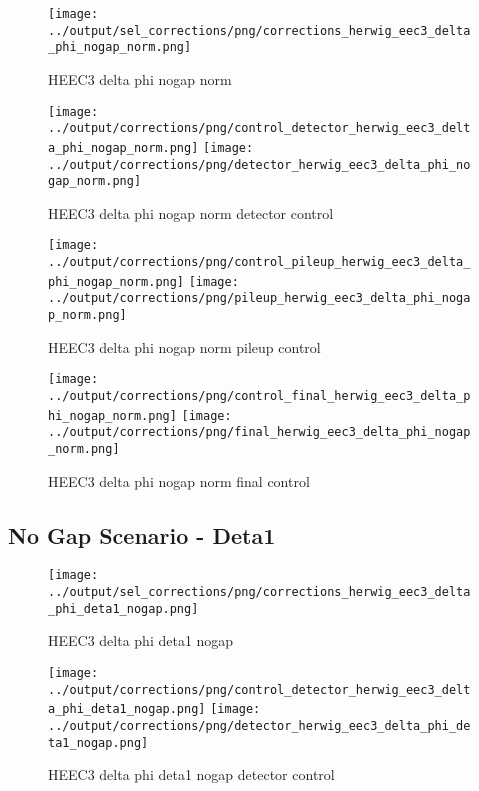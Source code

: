 \documentclass[11pt]{book}
\begin{document}
\begin{figure}[ht]
\centering
\texttt{[image: ../output/sel\_corrections/png/corrections\_herwig\_eec3\_delta\_phi\_nogap\_norm.png]}
\caption{HEEC3 delta phi nogap norm}
\label{fig:HEEC3_delta_phi_nogap_norm}
\end{figure}

\begin{figure}[ht]
\centering
\texttt{[image: ../output/corrections/png/control\_detector\_herwig\_eec3\_delta\_phi\_nogap\_norm.png]}
\texttt{[image: ../output/corrections/png/detector\_herwig\_eec3\_delta\_phi\_nogap\_norm.png]}
\caption{HEEC3 delta phi nogap norm detector control}
\label{fig:HEEC3_delta_phi_nogap_norm_detector_control}
\end{figure}

\begin{figure}[ht]
\centering
\texttt{[image: ../output/corrections/png/control\_pileup\_herwig\_eec3\_delta\_phi\_nogap\_norm.png]}
\texttt{[image: ../output/corrections/png/pileup\_herwig\_eec3\_delta\_phi\_nogap\_norm.png]}
\caption{HEEC3 delta phi nogap norm pileup control}
\label{fig:HEEC3_delta_phi_nogap_norm_pileup_control}
\end{figure}


\begin{figure}[ht]
\centering
\texttt{[image: ../output/corrections/png/control\_final\_herwig\_eec3\_delta\_phi\_nogap\_norm.png]}
\texttt{[image: ../output/corrections/png/final\_herwig\_eec3\_delta\_phi\_nogap\_norm.png]}
\caption{HEEC3 delta phi nogap norm final control}
\label{fig:HEEC3_delta_phi_nogap_norm_final_control}
\end{figure}


\clearpage
\subsection{No Gap Scenario - Deta1}
\begin{figure}[ht]
\centering
\texttt{[image: ../output/sel\_corrections/png/corrections\_herwig\_eec3\_delta\_phi\_deta1\_nogap.png]}
\caption{HEEC3 delta phi deta1 nogap}
\label{fig:HEEC3_delta_phi_deta1_nogap}
\end{figure}


\begin{figure}[ht]
\centering
\texttt{[image: ../output/corrections/png/control\_detector\_herwig\_eec3\_delta\_phi\_deta1\_nogap.png]}
\texttt{[image: ../output/corrections/png/detector\_herwig\_eec3\_delta\_phi\_deta1\_nogap.png]}
\caption{HEEC3 delta phi deta1 nogap detector control}
\label{fig:HEEC3_delta_phi_deta1_nogap_detector_control}
\end{figure}
\end{document}
